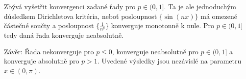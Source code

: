 \documentclass[answers]{exam}
\begin{document}
\begin{questions}
\begin{solution}
  	Zbývá vyšetřit konvergenci zadané řady pro $p \in (0, 1]$. Ta je ale jednoduchým důsledkem Dirichletova kritéria, neboť posloupnost $\{ \sin(nx) \}$ má omezené částečné součty a posloupnost $\{ \frac{1}{n^p} \}$ konverguje monotonně k nule. Pro $p \in (0, 1]$ tedy daná řada konverguje neabsolutně.
  	
  	Závěr: Řada nekonverguje pro $p \le 0$, konverguje neabsolutně pro $p \in (0, 1]$ a konverguje absolutně pro $p > 1$. Uvedené výsledky jsou nezávislé na parametru $x \in (0, \pi)$.
  \end{solution}
   
\end{questions}
\end{document}
